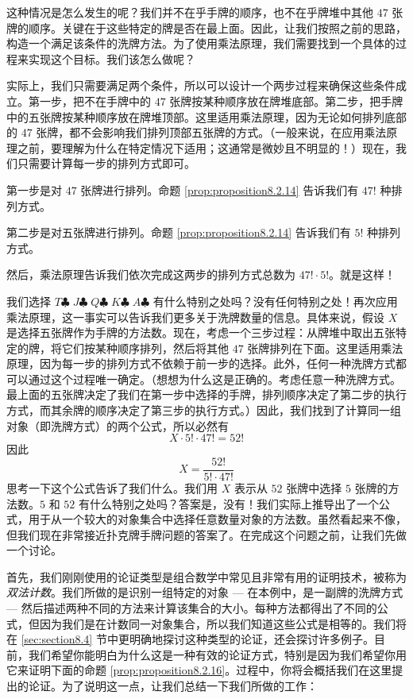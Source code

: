 这种情况是怎么发生的呢？我们并不在乎手牌的顺序，也不在乎牌堆中其他 $47$ 张牌的顺序。关键在于这些特定的牌是否在最上面。因此，让我们按照之前的思路，构造一个满足该条件的洗牌方法。为了使用乘法原理，我们需要找到一个具体的过程来实现这个目标。我们该怎么做呢？

实际上，我们只需要满足两个条件，所以可以设计一个两步过程来确保这些条件成立。第一步，把不在手牌中的 $47$ 张牌按某种顺序放在牌堆底部。第二步，把手牌中的五张牌按某种顺序放在牌堆顶部。这里适用乘法原理，因为无论如何排列底部的 $47$ 张牌，都不会影响我们排列顶部五张牌的方式。（一般来说，在应用乘法原理之前，要理解为什么在特定情况下适用；这通常是微妙且不明显的！）现在，我们只需要计算每一步的排列方式即可。

第一步是对 $47$ 张牌进行排列。命题 \ref{prop:proposition8.2.14} 告诉我们有 $47!$ 种排列方式。

第二步是对五张牌进行排列。命题 \ref{prop:proposition8.2.14} 告诉我们有 $5!$ 种排列方式。

然后，乘法原理告诉我们依次完成这两步的排列方式总数为 $47! \cdot 5!$。就是这样！

我们选择 $T\clubsuit\; J\clubsuit\; Q\clubsuit\; K\clubsuit\; A\clubsuit$ 有什么特别之处吗？没有任何特别之处！再次应用乘法原理，这一事实可以告诉我们更多关于洗牌数量的信息。具体来说，假设 $X$ 是选择五张牌作为手牌的方法数。现在，考虑一个三步过程：从牌堆中取出五张特定的牌，将它们按某种顺序排列，然后将其他 $47$ 张牌排列在下面。这里适用乘法原理，因为每一步的排列方式不依赖于前一步的选择。此外，任何一种洗牌方式都可以通过这个过程唯一确定。（想想为什么这是正确的。考虑任意一种洗牌方式。最上面的五张牌决定了我们在第一步中选择的手牌，排列顺序决定了第二步的执行方式，而其余牌的顺序决定了第三步的执行方式。）因此，我们找到了计算同一组对象（即洗牌方式）的两个公式，所以必然有
\[X \cdot 5! \cdot 47! = 52!\]
因此
\[X = \frac{52!}{5! \cdot 47!}\]
思考一下这个公式告诉了我们什么。我们用 $X$ 表示从 $52$ 张牌中选择 $5$ 张牌的方法数。$5$ 和 $52$ 有什么特别之处吗？答案是，没有！我们实际上推导出了一个公式，用于从一个较大的对象集合中选择任意数量对象的方法数。虽然看起来不像，但我们现在非常接近扑克牌手牌问题的答案了。在完成这个问题之前，让我们先做一个讨论。

首先，我们刚刚使用的论证类型是组合数学中常见且非常有用的证明技术，被称为\emph{双法计数}。我们所做的是识别一组特定的对象 --- 在本例中，是一副牌的洗牌方式 --- 然后描述两种不同的方法来计算该集合的大小。每种方法都得出了不同的公式，但因为我们是在计数同一对象集合，所以我们知道这些公式是相等的。我们将在 \ref{sec:section8.4} 节中更明确地探讨这种类型的论证，还会探讨许多例子。目前，我们希望你能明白为什么这是一种有效的论证方式，特别是因为我们希望你用它来证明下面的命题 \ref{prop:proposition8.2.16}。过程中，你将会概括我们在这里提出的论证。为了说明这一点，让我们总结一下我们所做的工作：

